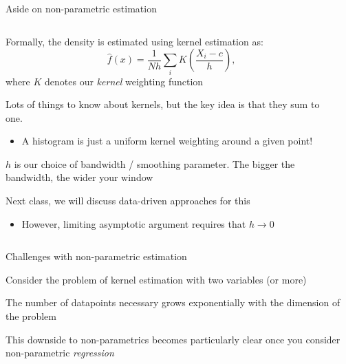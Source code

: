 \documentclass[notes,11pt, aspectratio=169]{beamer}
\newenvironment{wideitemize}{\itemize\addtolength{\itemsep}{10pt}}{\enditemize}
\begin{document}
\begin{frame}{Aside on non-parametric estimation}
  \begin{columns}[onlytextwidth, T] %
    \begin{column}{.7\textwidth}
  \begin{wideitemize}
  \item Formally, the density is estimated using kernel estimation as:
    \begin{equation*}
      \hat{f}(x) = \frac{1}{Nh}\sum_{i}K\left(\frac{X_{i} - c}{h}\right),
    \end{equation*}
    where $K$ denotes our \emph{kernel} weighting function
  \item Lots of things to know about kernels, but the key idea is that they sum to one.
    \begin{itemize}
    \item A histogram is just a uniform kernel weighting around a given point!
    \end{itemize}
  \item $h$ is our choice of bandwidth / smoothing parameter. The
    bigger the bandwidth, the wider your window
  \item Next class, we will discuss data-driven approaches for this
    \begin{itemize}
    \item However, limiting asymptotic argument requires that $h \to 0$
    \end{itemize}
  \end{wideitemize}
    \end{column}%
    \hfill%
    \begin{column}{.3\textwidth}
    \end{column}%
  \end{columns}
\end{frame}


\begin{frame}{Challenges with non-parametric estimation}
  \begin{wideitemize}
  \item   Consider the problem of kernel estimation with two variables (or more)
  \item   The number of datapoints necessary grows exponentially with the
    dimension of the problem
  \item   This downside to non-parametrics becomes particularly clear once you
  consider non-parametric \emph{regression} 
  \end{wideitemize}
\end{frame}
\end{document}
